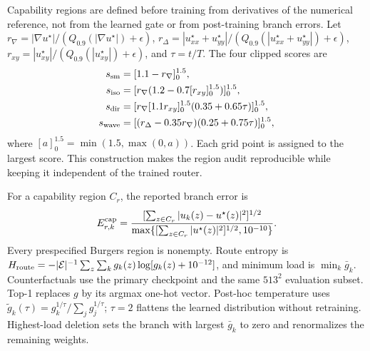 \documentclass[preprint,12pt]{elsarticle}
\theoremstyle{remark}
\begin{document}
Capability regions are defined before training from derivatives of the numerical reference, not from the learned gate or from post-training branch errors. Let
$r_\nabla=|\nabla u^\star|/(Q_{0.9}(|\nabla u^\star|)+\epsilon)$,
$r_\Delta=|u_{xx}^\star+u_{yy}^\star|/(Q_{0.9}(|u_{xx}^\star+u_{yy}^\star|)+\epsilon)$,
$r_{xy}=|u_{xy}^\star|/(Q_{0.9}(|u_{xy}^\star|)+\epsilon)$, and $\tau=t/T$.
The four clipped scores are
\begin{align}
s_{\rm sm}&=[1.1-r_\nabla]_{0}^{1.5},\\
s_{\rm iso}&=[r_\nabla(1.2-0.7[r_{xy}]_{0}^{1.5})]_{0}^{1.5},\\
s_{\rm dir}&=[r_\nabla[1.1r_{xy}]_{0}^{1.5}(0.35+0.65\tau)]_{0}^{1.5},\\
s_{\rm wave}&=[(r_\Delta-0.35r_\nabla)(0.25+0.75\tau)]_{0}^{1.5},
\end{align}
where $[a]_{0}^{1.5}=\min(1.5,\max(0,a))$. Each grid point is assigned to the largest score. This construction makes the region audit reproducible while keeping it independent of the trained router.

For a capability region $C_r$, the reported branch error is
\begin{equation}
E^{\rm cap}_{r,k}=\frac{[\sum_{z\in C_r}|u_k(z)-u^\star(z)|^2]^{1/2}}
{\max\{[\sum_{z\in C_r}|u^\star(z)|^2]^{1/2},10^{-10}\}}.
\end{equation}
Every prespecified Burgers region is nonempty. Route entropy is $H_{\rm route}=-|\mathcal E|^{-1}\sum_z\sum_k g_k(z)\log[g_k(z)+10^{-12}]$, and minimum load is $\min_k\bar g_k$. Counterfactuals use the primary checkpoint and the same $513^2$ evaluation subset. Top-1 replaces $g$ by its argmax one-hot vector. Post-hoc temperature uses $\widetilde g_k(\tau)=g_k^{1/\tau}/\sum_jg_j^{1/\tau}$; $\tau=2$ flattens the learned distribution without retraining. Highest-load deletion sets the branch with largest $\bar g_k$ to zero and renormalizes the remaining weights.
\end{document}
